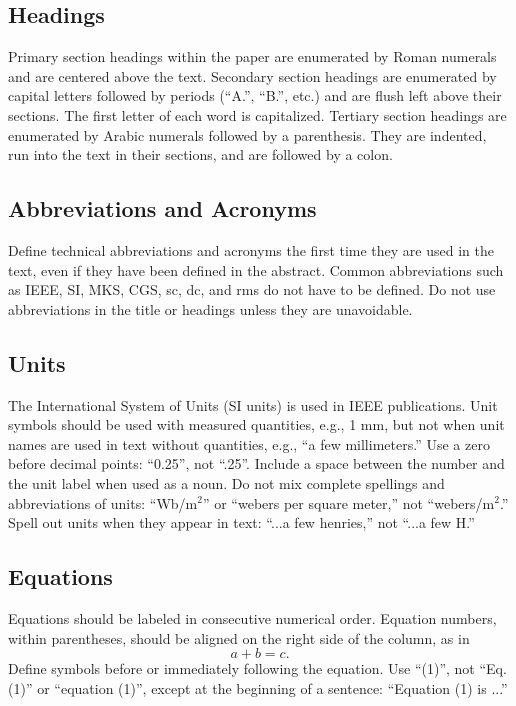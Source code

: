 \documentclass[]{NRSMRev}
\begin{document}
\subsection{Headings}
Primary section headings within the paper are enumerated by Roman numerals and are centered above the text.  Secondary section headings are enumerated by capital letters followed by periods (``A.'', ``B.'', etc.) and are flush left above their sections. The first letter of each word is capitalized. Tertiary section headings are enumerated by Arabic numerals followed by a parenthesis. They are indented, run into the text in their sections, and are followed by a colon.

\subsection{Abbreviations and Acronyms}
Define technical abbreviations and acronyms the first time they are used in the text, even if they have been defined in the abstract. Common abbreviations such as IEEE, SI, MKS, CGS, sc, dc, and rms do not have to be defined. Do not use abbreviations in the title or headings unless they are unavoidable.

\subsection{Units}
The International System of Units (SI units) is used in IEEE publications. Unit symbols should be used with measured quantities, e.g., 1 mm, but not when unit names are used in text without quantities, e.g., ``a few millimeters.'' Use a zero before decimal points: ``0.25'', not ``.25''. Include a space between the number and the unit label when used as a noun.  Do not mix complete spellings and abbreviations of units: ``Wb/m$^2$'' or ``webers per square meter,'' not ``webers/m$^2$.''  Spell out units when they appear in text: ``...a few henries,'' not ``...a few H.''

\subsection{Equations}
Equations should be labeled in consecutive numerical order. Equation numbers, within parentheses, should be aligned on the right side of the column, as in
\begin{equation}
  a+b=c.
\end{equation}         	
Define symbols before or immediately following the equation. Use ``(1)'', not ``Eq. (1)'' or ``equation (1)'', except at the beginning of a sentence: ``Equation (1) is ...''
\end{document}
